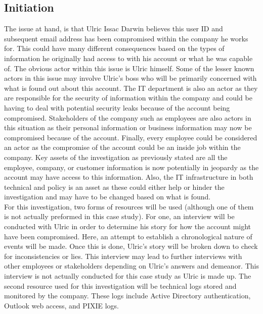 \documentclass[paper=a4, fontsize=11pt]{scrartcl} %
\numberwithin{equation}{section} %
\numberwithin{figure}{section} %
\numberwithin{table}{section} %
\begin{document}
\subsection{Initiation}
The issue at hand, is that Ulric Issac Darwin believes this user ID and subsequent email address
has been compromised within the company he works for. This could have many different consequences
based on the types of information he originally had access to with his account or what he
was capable of. The obvious actor within this issue is Ulric himself. Some of the lesser known
actors in this issue may involve Ulric's boss who will be primarily concerned with what is found
out about this account. The IT department is also an actor as they are responsible for the
security of information within the company and could be having to deal with potential security
leaks because of the account being compromised. Stakeholders of the company such as employees
are also actors in this situation as their personal information or business information may
now be compromised because of the account. Finally, every employee could be considered an actor
as the compromise of the account could be an inside job within the company. Key assets of the
investigation as previously stated are all the employee, company, or customer information is 
now potentially in jeopardy as the account may have access to this information. Also, the IT
infrastructure in both technical and policy is an asset as these could either help or hinder
the investigation and may have to be changed based on what is found.\\

For this investigation, two forms of resources will be used (although one of them is not
actually preformed in this case study). For one, an interview will be conducted with Ulric in
order to determine his story for how the account might have been compromised. Here, an
attempt to establish a chronological nature of events will be made. Once this is done,
Ulric's story will be broken down to check for inconsistencies or lies. This interview
may lead to further interviews with other employees or stakeholders depending on Ulric's
answers and demeanor. This interview is not actually conducted for this case study as
Ulric is made up. The second resource used for this investigation will be technical logs
stored and monitored by the company. These logs include Active Directory authentication, Outlook
web access, and PIXIE logs. 

\end{document}
